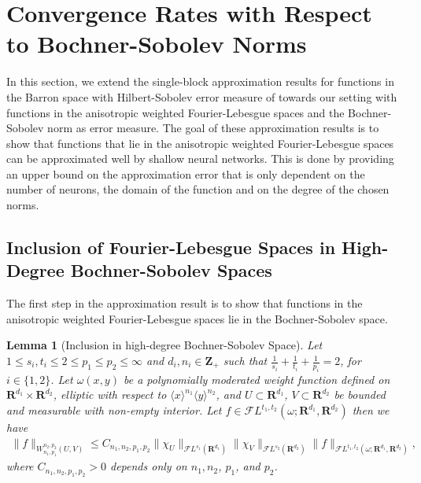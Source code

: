 \documentclass[a4paper]{article}
\newcommand{\rr}[1]{\mathbf{R}^{#1}}
\newcommand{\rrI}{\rr{d_1}}
\newcommand{\rrII}{\rr{d_2}}
\newcommand{\rrIxII}{\rrI\times\rrII}
\newcommand{\zzp}[1]{\mathbf{Z}_+^{#1}}
\newcommand{\eabs}[1]{\langle #1\rangle}     %
\newcommand{\norm}[2]{\|#1\|_{#2}}
\newcommand{\F}[0]{\mathscr{F}}
\newcommand{\FL}[1]{\F L^{#1}}
\newcommand{\chF}[1]{\chi_{#1}}
\numberwithin{equation}{section}
\newtheorem{lemma}[theorem]{Lemma}
\theoremstyle{remark}
\begin{document}
\section{Convergence Rates with Respect to Bochner-Sobolev Norms}
\label{sec:main}

In this section, we extend
the single-block approximation results
for functions in the Barron space
with Hilbert-Sobolev error measure
of \cite{Siegel20ApproximationRatesNeural}
towards our setting with
functions in the anisotropic weighted Fourier-Lebesgue spaces
and the Bochner-Sobolev norm as error measure.
The goal of these approximation results is to show
that functions that lie in the anisotropic weighted Fourier-Lebesgue spaces
can be approximated well by shallow neural networks.
This is done by providing an upper bound on the approximation error that is only dependent on the number of neurons, the domain of the function and on the degree of the chosen norms.


\subsection{Inclusion of Fourier-Lebesgue Spaces in High-Degree Bochner-Sobolev Spaces}
\label{subsec:ConvergenceInBochnerSobolevNorms}
The first step in the approximation result is to show that functions in the anisotropic weighted Fourier-Lebesgue spaces lie in the Bochner-Sobolev space.
\begin{lemma}[Inclusion in high-degree Bochner-Sobolev Space]
\label{lem:smoothness_lemma_high_degree}
    Let
    $1\leq s_i,t_i\leq 2\leq p_1\leq p_2\leq \infty$
     and $d_i, n_i \in\zzp{}$
    such that $\frac{1}{s_i} + \frac{1}{t_i} + \frac{1}{p_i} = 2$,
    for $i\in\{1,2\}$.
    Let $\omega(x,y)$ be a polynomially moderated weight function
    defined on $\rrIxII$, elliptic with respect to
    $\eabs{x}^{n_1}\eabs{y}^{n_2}$,
    and
    $U\subset \rrI$,
    $V\subset \rrII$ be bounded and measurable with non-empty interior.
    Let $f\in \FL{t_1,t_2}(\omega;\rrI,\rrII)$
	then we have
    \begin{align}
        \label{res:high_degree_bound}
		\norm{f}{W_{n_1,p_1}^{n_2, p_2}(U, V)}
        \leq 
            C_{n_1,n_2,p_1,p_2}\norm{{\chF{U}}}{\FL{s_1}(\rrI)}
            \norm{{\chF{V}}}{\FL{s_2}(\rrII)}
            \norm{f}{\FL{t_1,t_2}(\omega;\rrI,\rrII)},
	\end{align}
    where $C_{n_1,n_2,p_1,p_2}>0$ depends only on $n_1, n_2$, $p_1$, and $p_2$.   
\end{lemma}
\end{document}
